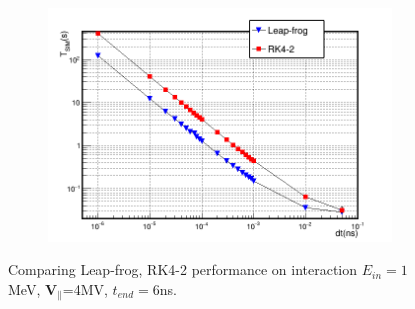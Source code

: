 \documentclass[a4paper,oneside,12pt]{report}
\numberwithin{equation}{chapter}
\begin{document}
{\begin{figure}[H]
    \begin{subfigure}{0.9\textwidth}
        \centering
        \includegraphics[width=\linewidth]{./figures/analiz/staticE_lf_rk2_dt-Tsim.png}
    \end{subfigure}
    \caption{Comparing Leap-frog, RK4-2 performance on \eE interaction $E_{in}=1$MeV, $\textbf{V}_{\parallel}$=4MV, $t_{end}=6$ns.}
    \label{fig:lf_rk2_par_stat_E_comparison}
\end{figure}\fi 
\begin{figure}[H]
    \centering
    \vspace{10pt}
    

\end{figure}}
\end{document}
